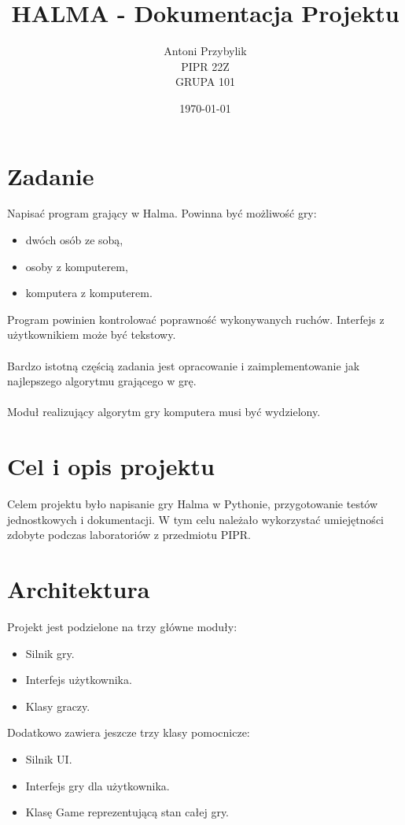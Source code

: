\documentclass[12pt, titlepage]{article}
\author{Antoni Przybylik\\ PIPR 22Z\\ GRUPA 101}
\date{\today}
\title{HALMA - Dokumentacja Projektu}
\begin{document}
\maketitle
\justifying

\section{Zadanie}
Napisać program grający w Halma. Powinna być możliwość gry:

\begin{itemize}
\item dwóch osób ze sobą,
\item osoby z komputerem,
\item komputera z komputerem.
\end{itemize}

\noindent
Program powinien kontrolować poprawność wykonywanych ruchów. Interfejs z użytkownikiem może być tekstowy.
\\~\\
Bardzo istotną częścią zadania jest opracowanie i zaimplementowanie jak najlepszego algorytmu grającego w grę.
\\~\\
Moduł realizujący algorytm gry komputera musi być wydzielony.

\section{Cel i opis projektu}
Celem projektu było napisanie gry Halma w Pythonie,
przygotowanie testów jednostkowych i dokumentacji.
W tym celu należało wykorzystać umiejętności zdobyte
podczas laboratoriów z przedmiotu PIPR.

\section{Architektura}
Projekt jest podzielone na trzy główne moduły:
\begin{itemize}
\item Silnik gry.
\item Interfejs użytkownika.
\item Klasy graczy.
\end{itemize}

\noindent
Dodatkowo zawiera jeszcze trzy klasy pomocnicze:
\begin{itemize}
\item Silnik UI.
\item Interfejs gry dla użytkownika.
\item Klasę Game reprezentującą stan całej gry.
\end{itemize}
\end{document}
